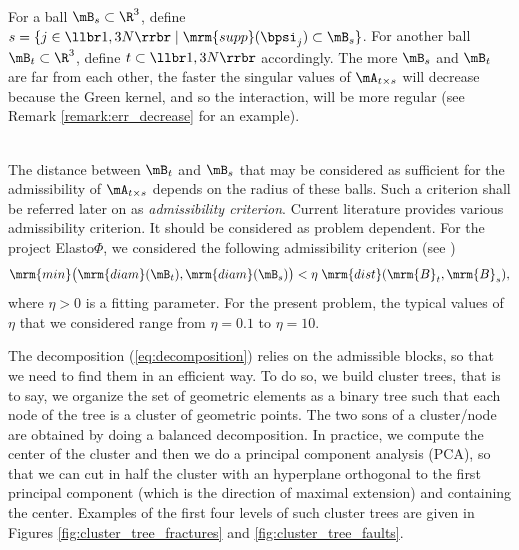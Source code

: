 \quad\\
For a ball $\mB_{s}\subset \R^{3}$, define $s = \{j \in\llbr 1,3N\rrbr\;\vert \;\mrm{supp}(\bpsi_{j})\subset \mB_{s}\}$. 
For another ball $\mB_{t}\subset \R^{3}$, define $t\subset \llbr1,3N\rrbr$ accordingly.  
The more $\mB_{s}$ and $\mB_{t}$ are far from each other, the faster the singular values of $\mA_{t \times s}$ will decrease because the Green kernel, and so the interaction, will be more regular (see Remark \ref{remark:err_decrease} for an example).

\quad\\
The distance between $\mB_{t}$ and $\mB_{s}$ that may be considered as sufficient for the admissibility of $\mA_{t \times s}$ depends on the radius of these balls. 
Such a criterion shall be referred later on as \textit{admissibility criterion}. Current literature provides various 
admissibility criterion. It should be considered as problem dependent. For the project Elasto$\Phi$, we considered the 
following admissibility criterion (see \cite{Rjasanow2007})
\begin{equation}\label{AdmissibilityCondition}
\mrm{min}\big( \mrm{diam}(\mB_{t}),\mrm{diam}(\mB_{s})\big)< \eta\;\mrm{dist}(\mrm{B}_{t},\mrm{B}_{s}),
\end{equation}
where $\eta>0$ is a fitting parameter. For the present problem, the typical values of $\eta$ that we considered  
range from $\eta = 0.1$ to $\eta = 10$. 

The decomposition (\ref{eq:decomposition}) relies on the admissible blocks, so that we need to find them in an efficient way. To do so, we build cluster trees, that is to say, we organize the set of geometric elements as a binary tree such that each node of the tree is a cluster of geometric points. The two sons of a cluster/node are obtained by doing a balanced decomposition. In practice, we compute the center of the cluster and then we do a principal component analysis (PCA), so that we can cut in half the cluster with an hyperplane orthogonal to the first principal component (which is the direction of maximal extension) and containing the center. Examples of the first four levels of such cluster trees are given in Figures \ref{fig:cluster_tree_fractures} and \ref{fig:cluster_tree_faults}.

